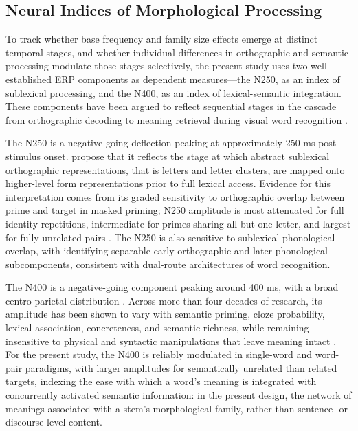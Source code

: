 \subsection{Neural Indices of Morphological Processing}

To track whether base frequency and family size effects emerge at distinct temporal stages, and whether individual differences in orthographic and semantic processing modulate those stages selectively, the present study uses two well-established ERP components as dependent measures---the N250, as an index of sublexical processing, and the N400, as an index of lexical-semantic integration. These components have been argued to reflect sequential stages in the cascade from orthographic decoding to meaning retrieval during visual word recognition \citep{graingerWatchingWordGo2009}.

The N250 is a negative-going deflection peaking at approximately 250 ms post-stimulus onset. \citet{holcombTimeCourseVisual2006} propose that it reflects the stage at which abstract sublexical orthographic representations, that is letters and letter clusters, are mapped onto higher-level form representations prior to full lexical access. Evidence for this interpretation comes from its graded sensitivity to orthographic overlap between prime and target in masked priming; N250 amplitude is most attenuated for full identity repetitions, intermediate for primes sharing all but one letter, and largest for fully unrelated pairs \citep{holcombTimeCourseVisual2006, holcomb_exploring_2007}. The N250 is also sensitive to sublexical phonological overlap, with \citet{graingerTimeCourseOrthographic2006} identifying separable early orthographic and later phonological subcomponents, consistent with dual-route architectures of word recognition.

The N400 is a negative-going component peaking around 400 ms, with a broad centro-parietal distribution \citep{kutasReadingSenselessSentences1980}. Across more than four decades of research, its amplitude has been shown to vary with semantic priming, cloze probability, lexical association, concreteness, and semantic richness, while remaining insensitive to physical and syntactic manipulations that leave meaning intact \citep{kutasThirtyYearsCounting2011}. For the present study, the N400 is reliably modulated in single-word and word-pair paradigms, with larger amplitudes for semantically unrelated than related targets, indexing the ease with which a word's meaning is integrated with concurrently activated semantic information: in the present design, the network of meanings associated with a stem's morphological family, rather than sentence- or discourse-level content.


